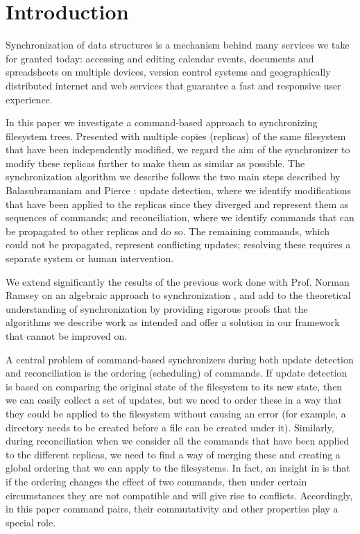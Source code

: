 
\section{Introduction}

Synchronization of data structures
is a mechanism behind many services we take for granted today:
accessing and editing calendar events, documents and spreadsheets
on multiple devices, version control systems and
geographically distributed internet and web services that
guarantee a fast and responsive user experience.

In this paper we investigate a command-based approach
to synchronizing filesystem trees.
Presented with multiple copies (replicas) of the same filesystem that have been independently modified,
we regard the aim of the synchronizer to modify these replicas further
to make them as similar as possible.
The synchronization algorithm we describe
follows the two main steps described by Balasubramaniam and Pierce \cite{BP}:
update detection, where we identify modifications that have been applied to the replicas
since they diverged and represent them as sequences of commands;
and reconciliation, where we identify commands that can be propagated to other replicas and do so.
The remaining commands, which could not be propagated, represent conflicting updates;
resolving these requires a separate system or human intervention.

We extend significantly the results of the previous work done
with Prof. Norman Ramsey
on an algebraic approach to synchronization
\cite{NREC},
and add to the theoretical understanding
of synchronization by providing rigorous proofs that the algorithms
we describe work as intended
and offer a solution in our framework that cannot be improved on.

A central problem of command-based synchronizers 
during both update detection and reconciliation
is the ordering (scheduling) of commands.
If update detection is based on comparing the original state of the filesystem
to its new state, then we can easily collect a set of updates,
but we need to order these in a way that they could be applied
to the filesystem without causing an error 
(for example, a directory needs to be created before a file can be created under it).
Similarly, during reconciliation when we consider all the commands that
have been applied to the different replicas, we need to find a way of
merging these and creating a global ordering that we can apply
to the filesystems.
In fact, an insight in \cite{NREC} is that
if the ordering changes the effect of two commands,
then under certain circumstances they are not compatible and will give rise to conflicts.
Accordingly, in this paper command pairs, their commutativity and other properties
play a special role.

